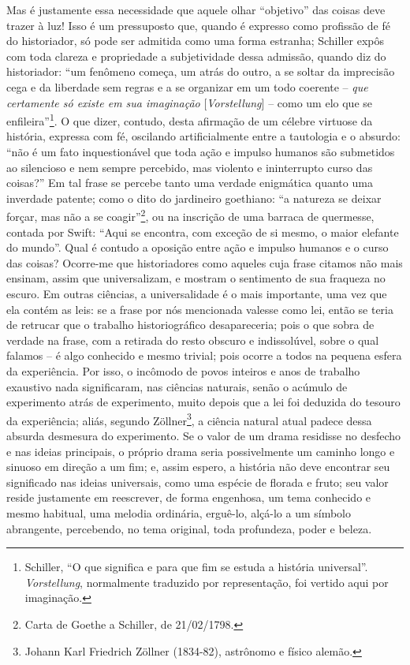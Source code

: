 Mas é justamente essa necessidade que aquele olhar ``objetivo'' das
coisas deve trazer à luz! Isso é um pressuposto que, quando é expresso
como profissão de fé do historiador, só pode ser admitida como uma forma
estranha; Schiller expôs com toda clareza e propriedade a subjetividade
dessa admissão, quando diz do historiador: ``um fenômeno começa, um
atrás do outro, a se soltar da imprecisão cega e da liberdade sem regras
e a se organizar em um todo coerente -- \emph{que certamente só existe
em sua imaginação} {[}\emph{Vorstellung}{]} -- como um elo que se
enfileira''\footnote{Schiller, ``O que significa e para que fim se
  estuda a história universal''. \emph{Vorstellung}, normalmente
  traduzido por representação, foi vertido aqui por imaginação.}. O que
dizer, contudo, desta afirmação de um célebre virtuose da história,
expressa com fé, oscilando artificialmente entre a tautologia e o
absurdo: ``não é um fato inquestionável que toda ação e impulso humanos
são submetidos ao silencioso e nem sempre percebido, mas violento e
ininterrupto curso das coisas?'' Em tal frase se percebe tanto uma
verdade enigmática quanto uma inverdade patente; como o dito do
jardineiro goethiano: ``a natureza se deixar forçar, mas não a se
coagir''\footnote{Carta de Goethe a Schiller, de 21/02/1798.}, ou na
inscrição de uma barraca de quermesse, contada por Swift: ``Aqui se
encontra, com exceção de si mesmo, o maior elefante do mundo''. Qual é
contudo a oposição entre ação e impulso humanos e o curso das coisas?
Ocorre-me que historiadores como aqueles cuja frase citamos não mais
ensinam, assim que universalizam, e mostram o sentimento de sua fraqueza
no escuro. Em outras ciências, a universalidade é o mais importante, uma
vez que ela contém as leis: se a frase por nós mencionada valesse como
lei, então se teria de retrucar que o trabalho historiográfico
desapareceria; pois o que sobra de verdade na frase, com a retirada do
resto obscuro e indissolúvel, sobre o qual falamos -- é algo conhecido e
mesmo trivial; pois ocorre a todos na pequena esfera da experiência. Por
isso, o incômodo de povos inteiros e anos de trabalho exaustivo nada
significaram, nas ciências naturais, senão o acúmulo de experimento
atrás de experimento, muito depois que a lei foi deduzida do tesouro da
experiência; aliás, segundo Zöllner\footnote{Johann Karl Friedrich
  Zöllner (1834-82), astrônomo e físico alemão.}, a ciência natural
atual padece dessa absurda desmesura do experimento. Se o valor de um
drama residisse no desfecho e nas ideias principais, o próprio drama
seria possivelmente um caminho longo e sinuoso em direção a um fim; e,
assim espero, a história não deve encontrar seu significado nas ideias
universais, como uma espécie de florada e fruto; seu valor reside
justamente em reescrever, de forma engenhosa, um tema conhecido e mesmo
habitual, uma melodia ordinária, erguê-lo, alçá-lo a um símbolo
abrangente, percebendo, no tema original, toda profundeza, poder e
beleza.

